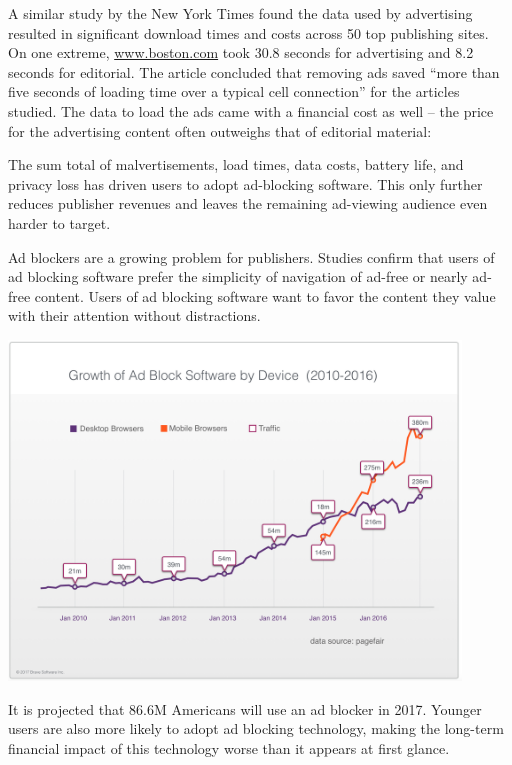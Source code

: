 \documentclass[11pt]{article}
\begin{document}
A similar study by the New York Times found the data used by advertising resulted in significant  download times and costs across 50 top publishing sites. On one extreme, \href{https://www.boston.com}{www.boston.com} took 30.8 seconds for advertising and 8.2 seconds for editorial. The article concluded that removing ads saved “more than five seconds of loading time over a typical cell connection” for the articles studied. The data to load the ads came with a financial cost as well -- the price for the advertising content often outweighs that of editorial material:

The sum total of malvertisements, load times, data costs, battery life, and privacy loss has driven users to adopt ad-blocking software. This only further reduces publisher revenues and leaves the remaining ad-viewing audience even harder to target.

Ad blockers are a growing problem for publishers. Studies confirm that users of ad blocking software prefer the simplicity of navigation of ad-free or nearly ad-free content. Users of ad blocking software want to favor the content they value with their attention without distractions.  

\begin{center}
\includegraphics[width=0.9\textwidth]{adblock_growth_by_device.png}
\end{center}

It is projected that 86.6M Americans will use an ad blocker in 2017\cite{10}. Younger users are also more likely to adopt ad blocking technology, making the long-term financial impact of this technology worse than it appears at first glance\cite{11}.
\end{document}
